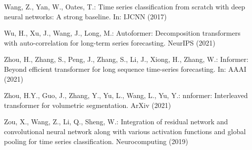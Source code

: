 \documentclass[runningheads]{llncs}
\begin{document}
\begin{thebibliography}{10}
    Wang, Z., Yan, W., Oates, T.: Time series classification from scratch with deep
      neural networks: A strong baseline. In: IJCNN (2017)
    
    Wu, H., Xu, J., Wang, J., Long, M.: Autoformer: Decomposition transformers with
      auto-correlation for long-term series forecasting. NeurIPS  (2021)
    
    Zhou, H., Zhang, S., Peng, J., Zhang, S., Li, J., Xiong, H., Zhang, W.:
      Informer: Beyond efficient transformer for long sequence time-series
      forecasting. In: AAAI (2021)
    
    Zhou, H.Y., Guo, J., Zhang, Y., Yu, L., Wang, L., Yu, Y.: nnformer: Interleaved
      transformer for volumetric segmentation. ArXiv  (2021)
    
    Zou, X., Wang, Z., Li, Q., Sheng, W.: Integration of residual network and
      convolutional neural network along with various activation functions and
      global pooling for time series classification. Neurocomputing  (2019)
    
    \end{thebibliography}
    


\clearpage


    
\end{document}
